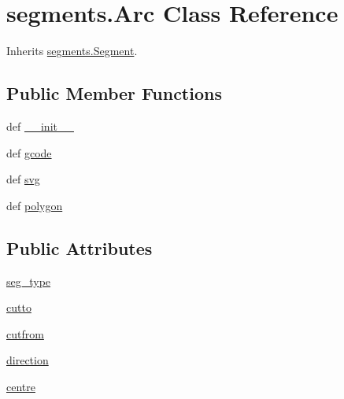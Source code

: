 \hypertarget{classsegments_1_1_arc}{}\section{segments.\+Arc Class Reference}
\label{classsegments_1_1_arc}


Inherits \hyperlink{classsegments_1_1_segment}{segments.\+Segment}.

\subsection*{Public Member Functions}
\begin{DoxyCompactItemize}
\item 
def \hyperlink{classsegments_1_1_arc_a08eec2d7f6ed97eefcdc0d41152dc057}{\+\_\+\+\_\+init\+\_\+\+\_\+}
\item 
def \hyperlink{classsegments_1_1_arc_ab622cf97665a7232a67c3ca0daed782e}{gcode}
\item 
def \hyperlink{classsegments_1_1_arc_ad7afcfb937d2664dbb98f02dac056790}{svg}
\item 
def \hyperlink{classsegments_1_1_arc_a19112ea291604037ab68f3892ef499d9}{polygon}
\end{DoxyCompactItemize}
\subsection*{Public Attributes}
\begin{DoxyCompactItemize}
\item 
\hyperlink{classsegments_1_1_arc_a71c20a4b59a2be61ce95288f70d9fc20}{seg\+\_\+type}
\item 
\hyperlink{classsegments_1_1_arc_aeeb31eaddd0bacd72f18c68fdada8380}{cutto}
\item 
\hyperlink{classsegments_1_1_arc_a387ceb50f0a06ce24bf80d7984cff84e}{cutfrom}
\item 
\hyperlink{classsegments_1_1_arc_a933f083c2aa6751f5924f810eb8ae060}{direction}
\item 
\hyperlink{classsegments_1_1_arc_a7e382975126df937ab515c621259aca4}{centre}
\end{DoxyCompactItemize}
